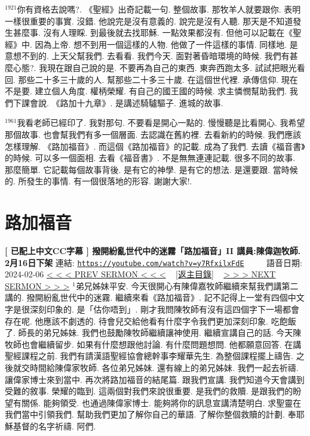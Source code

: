 \documentclass{book}
\begin{document}
$^{1921}$你有資格去說嗎?.
《聖經》出奇記載一句.
整個故事.
那牧羊人就要跟你.
表明一樣很重要的事實.
沒錯.
他說完是沒有意義的.
說完是沒有人聽.
那天是不知道發生甚麼事.
沒有人理睬.
到最後就去找耶穌.
一點效果都沒有.
但他可以記載在《聖經》中.
因為上帝.
想不到用一個這樣的人物.
他做了一件這樣的事情.
同樣地.
是意想不到的.
上天父幫我們.
去看看.
我們今天.
面對著昏暗環境的時候.
我們有甚麼心態?.
我現在跟自己說的是.
不要再為自己的東西.
東奔西跑太多.
試試把眼光看回.
那些二十多三十歲的人.
幫那些二十多三十歲.
在這個世代裡.
承傳信仰.
現在不是要.
建立個人角度.
權柄榮耀.
有自己的國王國的時候.
求主憐憫幫助我們.
我們下課會說.
《路加十九章》.
是講述騎驢驅子.
進城的故事.

$^{1961}$我看老師已經印了.
我對那句.
不要看是開心一點的.
慢慢聽是比看開心.
我希望那個故事.
也會幫我們有多一個層面.
去認識在舊約裡.
去看新約的時候.
我們應該怎樣理解.
《路加福音》.
而這個《路加福音》的記載.
成為了我們.
去讀《福音書》的時候.
可以多一個面相.
去看《福音書》.
不是無無連連記載.
很多不同的故事.
那麼簡單.
它記載每個故事背後.
是有它的神學.
是有它的想法.
是還要跟.
當時候的.
所發生的事情.
有一個很落地的形容.
謝謝大家!.
\newpage



\section{路加福音}
\label{sec:y7RfxilxFdE}
\textbf{[ 已配上中文CC字幕 ] 撥開紛亂世代中的迷霧「路加福音」II  講員:陳偉迦牧師. 2月16日下架}
\newline
\newline
連結: \href{https://youtube.com/watch?v=y7RfxilxFdE}{\texttt{https://youtube.com/watch?v=y7RfxilxFdE}} ~~~~ 語音日期: 2024-02-06
\newline
\newline
\hyperref[sec:KwXlOVraPWE]{\small{< < < PREV SERMON < < <}}
~
\hyperref[sec:index]{\small{[返主目錄]}}
~
\hyperref[sec:0tg98bwxbP8]{\small{> > > NEXT SERMON > > >}}
\newline
\newline
$^{1}$弟兄姊妹平安.
今天很開心有陳偉嘉牧師繼續來幫我們講第二講的.
撥開紛亂世代中的迷霧.
繼續來看《路加福音》.
記不記得上一堂有四個中文字是很深刻印象的.
是「估你唔到」.
剛才我問陳牧師有沒有這四個字下一場都會存在呢.
他應該不劇透的.
待會兒交給他看有什麼字令我們更加深刻印象.
吃飽飯了.
師長的弟兄姊妹.
我們也鼓勵陳牧師繼續讓神使用.
繼續宣講自己的話.
今天陳牧師也會繼續留步.
如果有什麼想跟他討論.
有什麼問題想問.
他都願意回答.
在講聖經課程之前.
我們有請漢語聖經協會總幹事李耀華先生.
為整個課程擺上禱告.
之後就交時間給陳偉家牧師.
各位弟兄姊妹.
還有線上的弟兄姊妹.
我們一起去祈禱.
讓偉家博士來到當中.
再次將路加福音的結尾篇.
跟我們宣講.
我們知道今天會講到受難的敘事.
榮耀的臨到.
這兩個對我們來說很重要.
是我們的救贖.
是跟我們的盼望有關係.
能夠領受.
也通過陳偉家博士.
能夠將你的訊息宣講清楚明白.
求聖靈在我們當中引領我們.
幫助我們更加了解你自己的華語.
了解你整個救贖的計劃.
奉耶穌基督的名字祈禱.
阿們.
\end{document}
